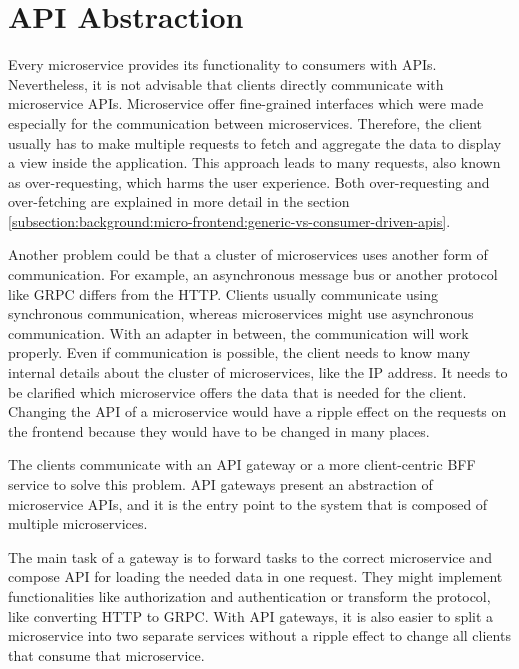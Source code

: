 \section{API Abstraction}\label{section:background:api-abstraction}

Every microservice provides its functionality to consumers with \acp{API}. Nevertheless, it is not advisable that clients directly communicate with microservice \acp{API}. Microservice offer fine-grained interfaces which were made especially for the communication between microservices. Therefore, the client usually has to make multiple requests to fetch and aggregate the data to display a view inside the application. \cite[69]{book:2021:newman:background:bff:micro-services} This approach leads to many requests, also known as over-requesting, which harms the user experience. \cite[254, 257]{book:2018:richardson:background:bff:microservices-patterns} Both over-requesting and over-fetching are explained in more detail in the section \ref{subsection:background:micro-frontend:generic-vs-consumer-driven-apis}.

\bigskip

\noindent Another problem could be that a cluster of microservices uses another form of communication. For example, an asynchronous message bus or another protocol like \ac{GRPC} differs from the \ac{HTTP}. Clients usually communicate using synchronous communication, whereas microservices might use asynchronous communication. With an adapter in between, the communication will work properly. Even if communication is possible, the client needs to know many internal details about the cluster of microservices, like the \ac{IP} address. It needs to be clarified which microservice offers the data that is needed for the client. Changing the \ac{API} of a microservice would have a ripple effect on the requests on the frontend because they would have to be changed in many places. \cite[254-257]{book:2018:richardson:background:bff:microservices-patterns}

\bigskip

\noindent The clients communicate with an \ac{API} gateway or a more client-centric \ac{BFF} service to solve this problem. \ac{API} gateways present an abstraction of microservice \acp{API}, and it is the entry point to the system that is composed of multiple microservices. \cite[19-20]{book:2020:siriwardena:background:bff:microservice-security-in-action}

\bigskip

\noindent The main task of a gateway is to forward tasks to the correct microservice and compose \ac{API} for loading the needed data in one request. They might implement functionalities like authorization and authentication or transform the protocol, like converting \ac{HTTP} to \ac{GRPC}. With \ac{API} gateways, it is also easier to split a microservice into two separate services without a ripple effect to change all clients that consume that microservice. \cite[260-263]{book:2018:richardson:background:bff:microservices-patterns}

